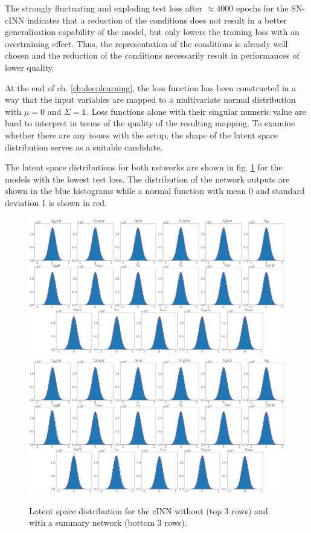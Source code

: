 The strongly fluctuating and exploding test loss after $\approx4000$ epochs for the SN-cINN indicates that a reduction of the conditions does not result in a better generalisation capability of the model, but only lowers the training loss with an overtraining effect. Thus, the representation of the conditions is already well chosen and the reduction of the conditions necessarily result in performances of lower quality.


At the end of ch. \ref{ch:deeplearning}, the loss function has been constructed in a way that the input variables are mapped to a multivariate normal distribution with $\mu = 0$ and $\Sigma=\mathds{1}$. Loss functions alone with their singular numeric value are hard to interpret in terms of the quality of the resulting mapping. To examine whether there are any issues with the setup, the shape of the latent space distribution serves as a suitable candidate.

The latent space distributions for both networks are shown in fig. \ref{fig:latents} for the models with the lowest test loss. The distribution of the network outputs are shown in the blue histograms while a normal function with mean 0 and standard deviation 1 is shown in red.

\begin{figure}[h!]
	\centering
	\includegraphics[width=\textwidth]{figures/inference/ls.png}
	\includegraphics[width=\textwidth]{figures/inference/ls_SN.png}
	\caption{Latent space distribution for the cINN without (top 3 rows) and with a summary network (bottom 3 rows).}
	\label{fig:latents}
\end{figure}

